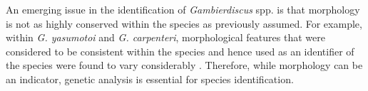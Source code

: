 \documentclass[12pt]{article}
\begin{document}
An emerging issue in the identification of \emph{Gambierdiscus} spp. is that morphology is not as highly conserved within the species as previously assumed. For example, within \emph{G. yasumotoi} and \emph{G. carpenteri}, morphological features that were considered to be consistent within the species and hence used as an identifier of the species were found to vary considerably \cite{murray2014molecular,kohli2014high}. Therefore, while morphology can be an indicator, genetic analysis is essential for species identification.

\FloatBarrier
\end{document}
